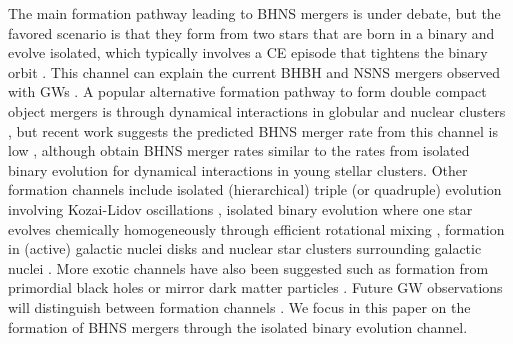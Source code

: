 \documentclass[twocolumn]{aastex63}
\newcommand{\floor}[1]{\textbf{\textcolor{magenta}{[Floor: #1]}}}
\newcommand\bhnsSingle{BHNS\xspace}
\begin{document}
The main formation pathway leading to BHNS mergers  is under debate, but the  favored scenario is that they form from  two stars that are born in a binary and evolve  isolated, which typically involves a \ac{CE} episode that tightens the binary orbit \citep{1976ApJ...207..574S, 1989A&ARv...1..209S}.  This channel can explain the  current \ac{BHBH} and \ac{NSNS} mergers observed with \acp{GW}   \citep[e.g.][]{2018MNRAS.479.4391M,2018PhRvD..97d3014W, 2019MNRAS.490.3740N, 2020arXiv200411866O}.
A popular alternative formation pathway to form double compact object mergers  is through dynamical interactions in globular  and nuclear clusters  \citep[e.g.][]{2000ApJ...528L..17P, 2013MNRAS.428.3618C,2014MNRAS.442..207C,2016PhRvD..93h4029R, 2020arXiv200302277R}, but recent work suggests the predicted \bhnsSingle merger rate from this channel is low   \citep{2014MNRAS.440.2714B, 2018MNRAS.480.4955F,2019ApJ...877..122Y, 2020ApJ...888L..10Y, 2020CmPhy...3...43A}, although  \citet{2020arXiv200302277R} obtain \bhnsSingle merger rates similar to the rates from isolated binary evolution for dynamical interactions in young stellar clusters.
Other  formation channels  include  isolated (hierarchical) triple (or quadruple) evolution involving Kozai-Lidov oscillations  \citep{2017ApJ...836...39S, 2019ApJ...883...23H,2019MNRAS.486.4443F,2019ApJ...878...58S}, %
 isolated binary evolution where one star evolves chemically homogeneously through efficient rotational mixing  \citep{2017A&A...604A..55M},  
 formation in (active) galactic nuclei disks  \citep{2020arXiv200200046M}
 and  nuclear star clusters surrounding galactic nuclei  \citep{2019MNRAS.488...47F}. More  exotic channels have also been suggested such as  formation from primordial black holes \citep{2013PhRvD..87l3524C,2014JCAP...06..026P} or mirror dark matter particles \citep{2019arXiv191004567B}.  
Future  \ac{GW} observations will distinguish between  formation channels \citep{2010CQGra..27k4007M,2015ApJ...810...58S,2017MNRAS.471.2801S, 2015MNRAS.450L..85M,2016ApJ...832L...2R,2016ApJ...830L..18B,2017Natur.548..426F,2017CQGra..34cLT01V, 2017ApJ...846...82Z, 2017PhRvD..96b3012T, 2018ApJ...863L..41F,2020arXiv200405187V}.
We focus in this paper on the formation of \bhnsSingle mergers through the isolated binary evolution channel. 
\end{document}
